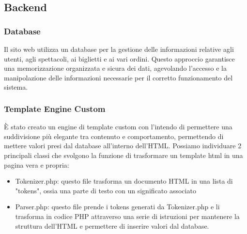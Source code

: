\subsection{Backend}
\subsubsection{Database}
Il sito web utilizza un database per la gestione delle informazioni relative agli utenti, agli spettacoli, ai biglietti e ai vari ordini. Questo approccio garantisce una memorizzazione organizzata e sicura dei dati, agevolando l'accesso e la manipolazione delle informazioni necessarie per il corretto funzionamento del sistema.
\\
\begin{minipage}{0.3\textwidth}
     
\end{minipage}

\subsubsection{Template Engine Custom}
È stato creato un engine di template custom con l'intendo di permettere una suddivisione più elegante tra contenuto e comportamento, permettendo di mettere valori presi dal database all'interno dell'HTML.
Possiamo individuare 2 principali classi che svolgono la funzione di trasformare un template html in una pagina vera e propria:
\begin{itemize}
    \item Tokenizer.php: questo file trasforma un documento HTML in una lista di "tokens", ossia una parte di testo con un significato associato 
    \item Parser.php: questo file prende i tokens generati da Tokenizer.php e li trasforma in codice PHP attraverso una serie di istruzioni per mantenere la struttura dell'HTML e permettere di inserire valori dal database.
\end{itemize}

